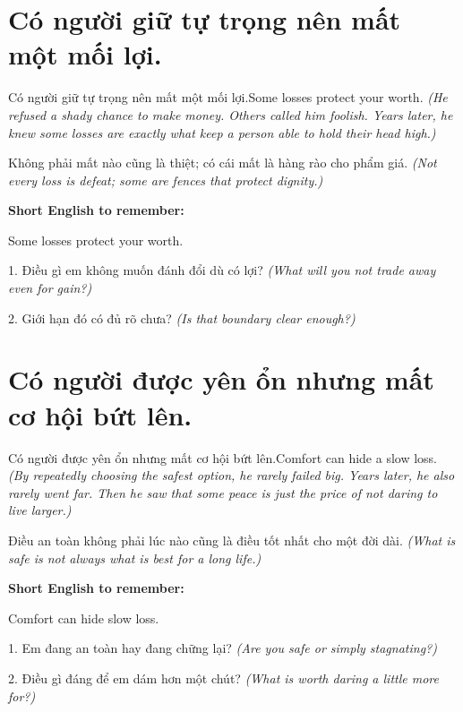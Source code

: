 \section{Có người giữ tự trọng nên mất một mối lợi.}
\begin{truyen}{Có người giữ tự trọng nên mất một mối lợi.}{Some losses protect your worth.}
\textit{(He refused a shady chance to make money. Others called him foolish. Years later, he knew some losses are exactly what keep a person able to hold their head high.)}
\end{truyen}
\begin{baihoc}
Không phải mất nào cũng là thiệt; có cái mất là hàng rào cho phẩm giá.
\textit{(Not every loss is defeat; some are fences that protect dignity.)}
\end{baihoc}
\begin{ghinhoanh}\textbf{Short English to remember:}

Some losses protect your worth.
\end{ghinhoanh}
\begin{tuhocnhanh}
1. Điều gì em không muốn đánh đổi dù có lợi? \textit{(What will you not trade away even for gain?)}

2. Giới hạn đó có đủ rõ chưa? \textit{(Is that boundary clear enough?)}
\end{tuhocnhanh}
\ngancach

\section{Có người được yên ổn nhưng mất cơ hội bứt lên.}
\begin{truyen}{Có người được yên ổn nhưng mất cơ hội bứt lên.}{Comfort can hide a slow loss.}
\textit{(By repeatedly choosing the safest option, he rarely failed big. Years later, he also rarely went far. Then he saw that some peace is just the price of not daring to live larger.)}
\end{truyen}
\begin{baihoc}
Điều an toàn không phải lúc nào cũng là điều tốt nhất cho một đời dài.
\textit{(What is safe is not always what is best for a long life.)}
\end{baihoc}
\begin{ghinhoanh}\textbf{Short English to remember:}

Comfort can hide slow loss.
\end{ghinhoanh}
\begin{tuhocnhanh}
1. Em đang an toàn hay đang chững lại? \textit{(Are you safe or simply stagnating?)}

2. Điều gì đáng để em dám hơn một chút? \textit{(What is worth daring a little more for?)}
\end{tuhocnhanh}
\ngancach

